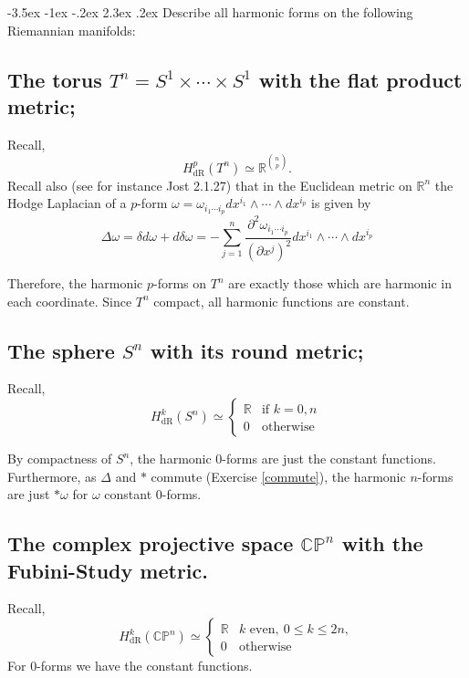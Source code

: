 \documentclass[10pt]{article}
\makeatletter
\renewcommand\section{\@startsection{section}{1}{\z@}%
                                  {-3.5ex \@plus -1ex \@minus -.2ex}%
                                  {2.3ex \@plus.2ex}%
                                  {\normalfont\large\bfseries}}
\newcommand{\CP}{\ensuremath{\mathbb{CP}}}
\newcommand{\R}{\ensuremath{\mathbb{R}}}
\newcommand{\del}{\ensuremath{\partial}}
\DeclareMathOperator{\2}{II}
\makeatother
\begin{document}
\section{Describe all harmonic forms on the following Riemannian manifolds:}
\subsection{The torus $T^n = S^1 \times \cdots \times S^1$ with the flat product metric;}
Recall,
\[H_{\mathrm{dR}}^{p}(T^n) \simeq \R^{n \choose p}.\]
Recall also (see for instance Jost 2.1.27) that in the Euclidean metric on $\R^n$ the Hodge Laplacian of a $p$-form $\omega = \omega_{i_1 \cdots i_p} dx^{i_1} \wedge \cdots \wedge dx^{i_p} $ is given by  
\[\Delta \omega = \delta d \omega + d \delta \omega = - \sum_{j=1}^n \frac{\del^2 \omega_{i_1 \cdots i_p}}{( \del x^j )^2} dx^{i_1} \wedge \cdots \wedge dx^{i_p}\]

Therefore, the harmonic $p$-forms on $T^n$ are exactly those which are harmonic in each coordinate. Since $T^n$  compact, all harmonic functions are constant. 


\subsection{The sphere $S^n$ with its round metric;}
Recall,
\[H_{\mathrm{dR}}^{k}(S^n) \simeq \begin{cases} \R & \mbox{if } k = 0, n \\ 0 & \mbox{otherwise } \end{cases}\]

By compactness of $S^n$, the harmonic 0-forms are just the constant functions. 
Furthermore, as $\Delta$ and $*$ commute (Exercise \ref{commute}), the harmonic $n$-forms are just $*\omega$ for $\omega$ constant 0-forms.

\subsection{\label{f-study}The complex projective space $\CP^n$ with the Fubini-Study metric.}
Recall,
\[H_{\mathrm{dR}}^k(\CP^n) \simeq \begin{cases} \R & k \mbox{ even},\ 0 \leq k \leq 2 n, \\ 0 & \mbox{otherwise} \end{cases}\]
For 0-forms we have the constant functions. 
\end{document}
